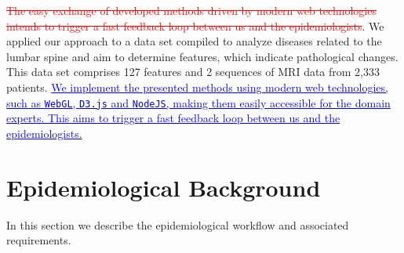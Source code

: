 \documentclass[journal]{style/vgtc} 			          %
\newcommand{\rem}[1]{\textcolor{red}{\sout{#1}}}
\newcommand{\add}[1]{\textcolor{blue}{\uline{#1}}}
\begin{document}
%
\rem{The easy exchange of developed methods driven by modern web technologies intends to trigger a fast feedback loop between us and the epidemiologists}.
We applied our approach to a data set compiled to analyze diseases related to the lumbar spine and aim to determine features, which indicate pathological changes.
%
This data set comprises 127 features and 2 sequences of MRI data from 2,333 patients.
%
\add{We implement the presented methods using modern web technologies, such as \texttt{WebGL}, \texttt{D3.js} and \texttt{NodeJS}, making them easily accessible for the domain experts.
%
This aims to trigger a fast feedback loop between us and the epidemiologists.}

\section{Epidemiological Background} \label{MedicalAndTechnicalBackground}

In this section we describe the epidemiological workflow and associated requirements.
\end{document}
